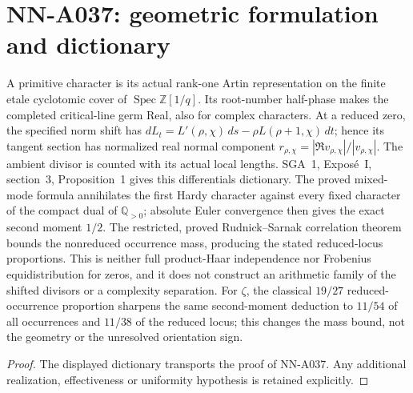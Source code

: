 \section{NN-A037: geometric formulation and dictionary}
\begin{geometricstatement}[NN-A037]
A primitive character is its actual rank-one Artin representation on the finite etale cyclotomic cover of $\operatorname{Spec}\mathbb Z[1/q]$. Its root-number half-phase makes the completed critical-line germ Real, also for complex characters. At a reduced zero, the specified norm shift has $dL_t=L\prime(\rho,\chi)\,ds-\rho L(\rho+1,\chi)\,dt$; hence its tangent section has normalized real normal component $r_{\rho,\chi}=|\Re v_{\rho,\chi}|/|v_{\rho,\chi}|$. The ambient divisor is counted with its actual local lengths. SGA~1, Expos\'e~I, section~3, Proposition~1 gives this differentials dictionary. The proved mixed-mode formula annihilates the first Hardy character against every fixed character of the compact dual of $\mathbb Q_{>0}$; absolute Euler convergence then gives the exact second moment $1/2$. The restricted, proved Rudnick--Sarnak correlation theorem bounds the nonreduced occurrence mass, producing the stated reduced-locus proportions. This is neither full product-Haar independence nor Frobenius equidistribution for zeros, and it does not construct an arithmetic family of the shifted divisors or a complexity separation. For $\zeta$, the classical $19/27$ reduced-occurrence proportion sharpens the same second-moment deduction to $11/54$ of all occurrences and $11/38$ of the reduced locus; this changes the mass bound, not the geometry or the unresolved orientation sign.
\end{geometricstatement}
\begin{proof} The displayed dictionary transports the proof of NN-A037. Any additional realization, effectiveness or uniformity hypothesis is retained explicitly.\end{proof}


